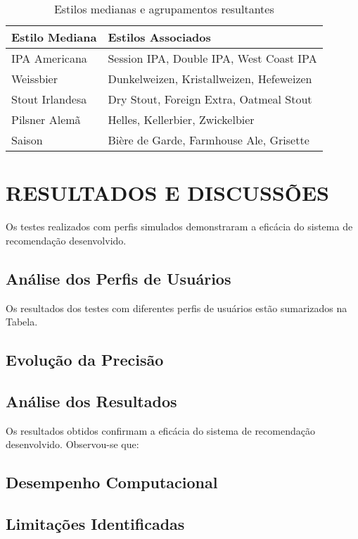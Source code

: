 \documentclass[12pt,a4paper]{article}
\begin{document}
\begin{table}[H]
\centering
\caption{Estilos medianas e agrupamentos resultantes}
\label{tab:medianas}
\begin{tabular}{ll}
\toprule
\textbf{Estilo Mediana} & \textbf{Estilos Associados} \\
\midrule
IPA Americana & Session IPA, Double IPA, West Coast IPA \\
Weissbier & Dunkelweizen, Kristallweizen, Hefeweizen \\
Stout Irlandesa & Dry Stout, Foreign Extra, Oatmeal Stout \\
Pilsner Alem\~a & Helles, Kellerbier, Zwickelbier \\
Saison & Bière de Garde, Farmhouse Ale, Grisette \\
\bottomrule
\end{tabular}
\end{table}

\section{RESULTADOS E DISCUSSÕES}

Os testes realizados com perfis simulados demonstraram a eficácia do sistema de recomendação desenvolvido. 

\subsection{Análise dos Perfis de Usuários}

Os resultados dos testes com diferentes perfis de usuários estão sumarizados na Tabela.

\subsection{Evolução da Precisão}

\subsection{Análise dos Resultados}

Os resultados obtidos confirmam a eficácia do sistema de recomendação desenvolvido. Observou-se que:

\subsection{Desempenho Computacional}

\subsection{Limitações Identificadas}
\end{document}
